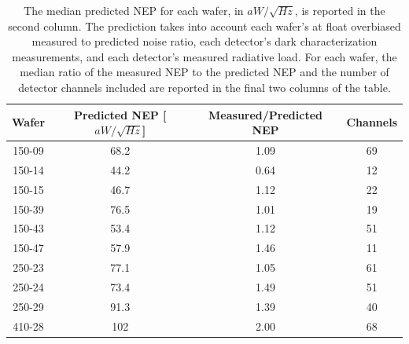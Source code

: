 \documentclass[../EBEXPaper2.tex]{subfiles}
\begin{document}
\begin{table}[ht!]
\begin{center}
\begin{tabular}{|c|c|c|c|}
\hline  Wafer & Predicted NEP [$aW/\sqrt{Hz}$] & Measured/Predicted NEP & Channels \\
\hline 150-09 & 68.2 & 1.09 & 69 \\
\hline 150-14 & 44.2 & 0.64 & 12 \\
\hline 150-15 & 46.7 & 1.12 & 22 \\
\hline 150-39 & 76.5 & 1.01 & 19 \\
\hline 150-43 & 53.4 & 1.12 & 51 \\
\hline 150-47 & 57.9 & 1.46 & 11 \\
\hline 250-23 & 77.1 & 1.05 & 61 \\
\hline 250-24 & 73.4 & 1.49 & 51 \\
\hline 250-29 & 91.3 & 1.39 & 40 \\
\hline 410-28 & 102 & 2.00 & 68 \\
\hline
\end{tabular}
\end{center}
\caption{The median predicted \ac{NEP} for each wafer, in $aW/\sqrt{Hz}$, is reported in the second column. The prediction takes into account each wafer's at float overbiased measured to predicted noise ratio, each detector's dark characterization measurements, and each detector's measured radiative load. For each wafer, the median ratio of the measured \ac{NEP} to the predicted \ac{NEP} and the number of detector channels included are reported in the final two columns of the table. }
\label{in_transition_noise_table}
\end{table}
\end{document}
